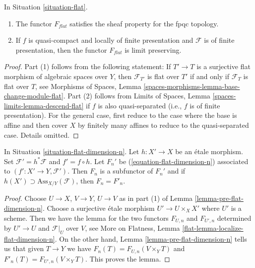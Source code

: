 \begin{lemma}
\label{lemma-flat}
In Situation \ref{situation-flat}.
\begin{enumerate}
\item The functor $F_{flat}$ satisfies the sheaf property for the fpqc topology.
\item If $f$ is quasi-compact and locally of finite presentation
and $\mathcal{F}$ is of finite presentation, then the functor
$F_{flat}$ is limit preserving.
\end{enumerate}
\end{lemma}

\begin{proof}
Part (1) follows from the following statement: If $T' \to T$ is a surjective
flat morphism of algebraic spaces over $Y$, then
$\mathcal{F}_{T'}$ is flat over $T'$ if and only if
$\mathcal{F}_T$ is flat over $T$, see
Morphisms of Spaces, Lemma \ref{spaces-morphisms-lemma-base-change-module-flat}.
Part (2) follows from
Limits of Spaces, Lemma \ref{spaces-limits-lemma-descend-flat}
if $f$ is also quasi-separated (i.e., $f$ is of finite presentation).
For the general case, first reduce to the case where the
base is affine and then cover $X$ by finitely many affines
to reduce to the quasi-separated case. Details omitted.
\end{proof}

\begin{lemma}
\label{lemma-localize-flat-dimension-n}
In Situation \ref{situation-flat-dimension-n}.
Let $h : X' \to X$ be an \'etale morphism.
Set $\mathcal{F}' = h^*\mathcal{F}$ and $f' = f \circ h$.
Let $F_n'$ be (\ref{equation-flat-dimension-n})
associated to $(f' : X' \to Y, \mathcal{F}')$.
Then $F_n$ is a subfunctor of $F_n'$ and if
$h(X') \supset \text{Ass}_{X/Y}(\mathcal{F})$, then $F_n = F'_n$.
\end{lemma}

\begin{proof}
Choose $U \to X$, $V \to Y$, $U \to V$ as in part (1) of
Lemma \ref{lemma-pre-flat-dimension-n}. Choose a surjective
\'etale morphism $U' \to U \times_X X'$ where $U'$ is a scheme.
Then we have the lemma for the two functors
$F_{U, n}$ and $F_{U', n}$ determined by $U' \to U$ and $\mathcal{F}|_U$
over $V$, see
More on Flatness, Lemma \ref{flat-lemma-localize-flat-dimension-n}.
On the other hand, Lemma \ref{lemma-pre-flat-dimension-n}
tells us that given $T \to Y$ we have
$F_n(T) = F_{U, n}(V \times_Y T)$
and
$F'_n(T) = F_{U', n}(V \times_Y T)$.
This proves the lemma.
\end{proof}


